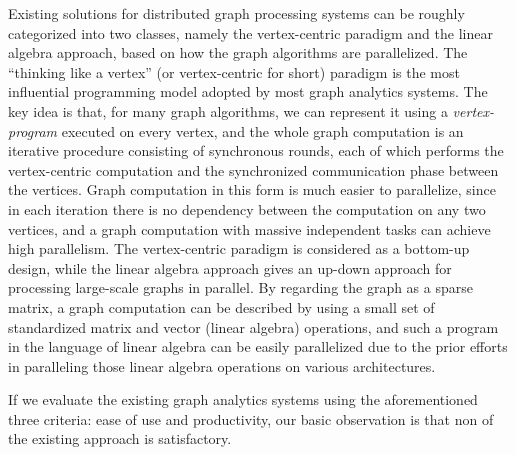 \documentclass{sokendai_thesis} %
\begin{document}
Existing solutions for distributed graph processing systems can be roughly categorized into two classes, namely the vertex-centric paradigm and the linear algebra approach, based on how the graph algorithms are parallelized.
The ``thinking like a vertex'' (or vertex-centric for short) paradigm is the most influential programming model adopted by most graph analytics systems\cite{survey,survey2}.
The key idea is that, for many graph algorithms, we can represent it using a \emph{vertex-program} executed on every vertex, and the whole graph computation is an iterative procedure consisting of synchronous rounds, each of which performs the vertex-centric computation and the synchronized communication phase between the vertices.
Graph computation in this form is much easier to parallelize, since in each iteration there is no dependency between the computation on any two vertices, and a graph computation with massive independent tasks can achieve high parallelism.
The vertex-centric paradigm is considered as a bottom-up design, while the linear algebra approach gives an up-down approach for processing large-scale graphs in parallel.
By regarding the graph as a sparse matrix, a graph computation can be described by using a small set of standardized matrix and vector (linear algebra) operations, and such a program in the language of linear algebra can be easily parallelized due to the prior efforts in paralleling those linear algebra operations on various architectures.



If we evaluate the existing graph analytics systems using the aforementioned three criteria: ease of use and productivity, our basic observation is that non of the existing approach is satisfactory.
\end{document}
